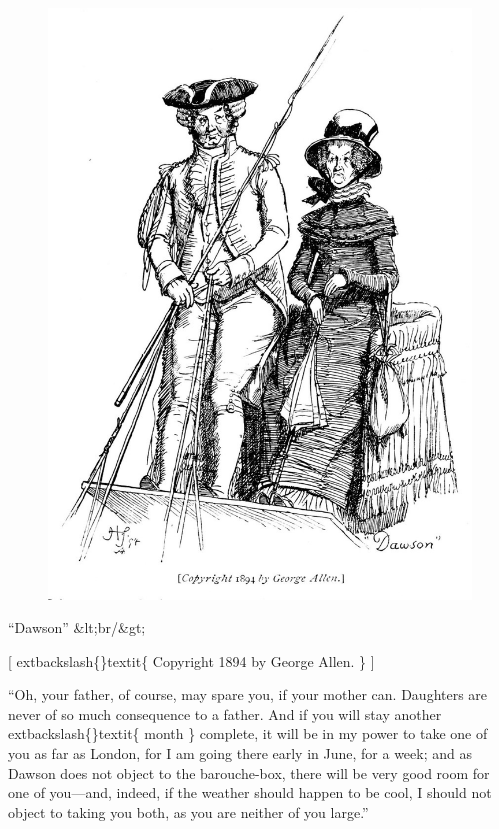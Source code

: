 \documentclass[10pt]{book}
\begin{document}
\begin{figure}[h]
\centering
\includegraphics[width=\linewidth]{images/i_292.jpg}
\end{figure}

     “Dawson”
     &lt;br/&gt;

     [
     	extbackslash\{\}textit\{
      Copyright 1894 by George Allen.
     \}
     ]
    

   “Oh, your father, of course, may spare you, if your mother can.
Daughters are never of so much consequence to a father. And if you will
stay another
   	extbackslash\{\}textit\{
    month
   \}
   complete, it will be in my power to take one of you
as far as London, for I am going there early in June,
   for a week; and
as Dawson does not object to the barouche-box, there will be very good
room for one of you—and, indeed, if the weather should happen to be
cool, I should not object to taking you both, as you are neither of you
large.”
  
\end{document}
